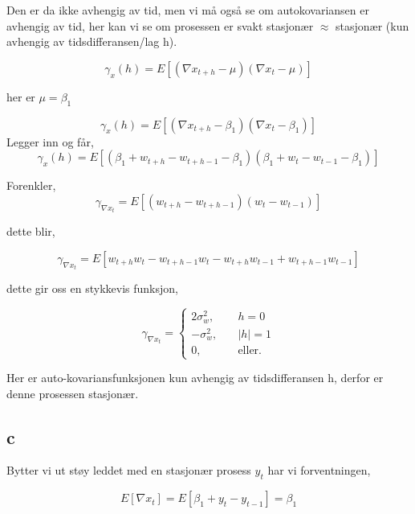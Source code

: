 \documentclass[10pt]{article}
\begin{document}
{Den er da ikke avhengig av tid, men vi må også se om autokovariansen er avhengig av tid, her kan vi se om prosessen er svakt stasjonær $\approx$ stasjonær (kun avhengig av tidsdifferansen/lag h).


\begin{equation*}
  \gamma_{x}(h) = E[(\nabla x_{t+h} - \mu)(\nabla x_{t} - \mu)]
\end{equation*}

her er $\mu = \beta_{1}$

\begin{equation}
  \gamma_{x}(h) = E[(\nabla x_{t+h} - \beta_{1})(\nabla x_{t} - \beta_{1})]
\end{equation}
Legger inn og får,
\begin{equation}
  \gamma_{x}(h) = E[(\beta_{1} + w_{t+h} - w_{t+h-1} - \beta_{1})(\beta_{1} + w_{t} - w_{t-1} - \beta_{1})]
\end{equation}

Forenkler,
 \begin{equation}
  \gamma_{\nabla x_{t}} = E[(w_{t+h} - w_{t+h-1})(w_{t} - w_{t-1})]
\end{equation}

dette blir,

  \begin{equation}
  \gamma_{\nabla x_{t}} = E[w_{t+h}w_{t} - w_{t+h-1}w_{t} - w_{t+h}w_{t-1} + w_{t+h-1}w_{t-1}]
\end{equation}

dette gir oss en stykkevis funksjon,

\[   
\gamma_{\nabla x_{t}} = 
   \begin{cases}
     2\sigma_{w}^2, &\quad h = 0\\
     -\sigma_{w}^2, &\quad |h| = 1 \\
     \text{0,} &\quad\text{eller.}
   \end{cases}
\]

Her er auto-kovariansfunksjonen kun avhengig av tidsdifferansen h, derfor er denne prosessen stasjonær.



\subsection{c}

Bytter vi ut støy leddet med en stasjonær prosess $y_{t}$ har vi forventningen,

\begin{equation*}
  E[\nabla x_{t}] = E[\beta_{1} + y_{t} - y_{t-1}] = \beta_{1}
\end{equation*}

}
\end{document}
